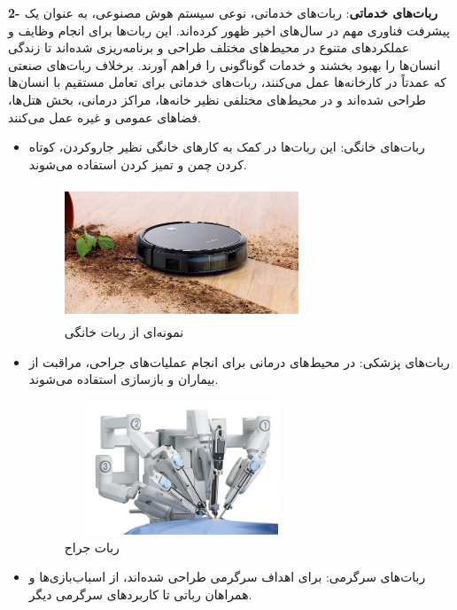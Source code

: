 \textbf{2- ربات‌های خدماتی}:
  ربات‌های خدماتی، نوعی سیستم هوش مصنوعی، به عنوان یک پیشرفت فناوری مهم در سال‌های اخیر ظهور کرده‌اند. این ربات‌ها برای انجام وظایف و عملکردهای متنوع در محیط‌های مختلف طراحی و برنامه‌ریزی شده‌اند تا زندگی انسان‌ها را بهبود بخشند و خدمات گوناگونی را فراهم آورند. برخلاف ربات‌های صنعتی که عمدتاً در کارخانه‌ها عمل می‌کنند، ربات‌های خدماتی برای تعامل مستقیم با انسان‌ها طراحی شده‌اند و در محیط‌های مختلفی نظیر خانه‌ها، مراکز درمانی، بخش هتل‌ها، فضاهای عمومی و غیره عمل می‌کنند.
\newpage
\begin{itemize}
	\item ربات‌های خانگی: این ربات‌ها در کمک به کارهای خانگی نظیر جارو‌کردن، کوتاه کردن چمن و تمیز کردن استفاده می‌شوند.
    \begin{figure}[!h]
	\vspace{0.2cm}
	\centering
	\includegraphics[height=4cm,width=7cm]{./Images/CH1/service_robot_2.jpg}
	\caption{نمونه‌ای از ربات خانگی}
	\label{ربات خانگی}
	\end{figure}
	
	\item ربات‌های پزشکی: در محیط‌های درمانی برای انجام عملیات‌های جراحی، مراقبت از بیماران و بازسازی استفاده می‌شوند.
    \begin{figure}[!h]
	\vspace{0.2cm}
	\centering
	\includegraphics[height=4cm,width=7cm]{./Images/CH1/service_robot_3.jpg}
	\caption{ربات جراح}
	\label{ربات جراح}
	\end{figure}

	\item ربات‌های سرگرمی: برای اهداف سرگرمی طراحی شده‌اند، از اسباب‌بازی‌ها و همراهان رباتی تا کاربردهای سرگرمی دیگر.
	

\end{itemize}
